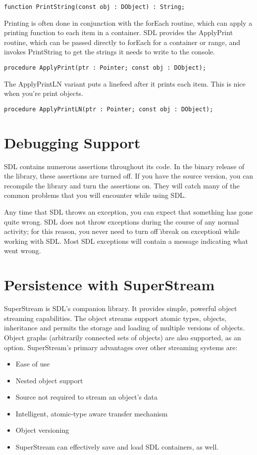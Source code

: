 \documentclass{report}
\begin{document}
\lstinline|function PrintString(const obj : DObject) : String;|

Printing is often done in conjunction with the forEach routine, which can
apply a printing function to each item in a container. SDL provides the
ApplyPrint routine, which can be passed directly to forEach for a container
or range, and invokes PrintString to get the strings
it needs to write to the console.

\lstinline|procedure ApplyPrint(ptr : Pointer; const obj : DObject);|

The ApplyPrintLN variant puts a linefeed after it prints 
each item. This is nice when you're print objects.

\lstinline|procedure ApplyPrintLN(ptr : Pointer; const obj : DObject);|

\chapter{Debugging Support}

SDL contains numerous assertions throughout its code.  In the binary release
of the library, these assertions are turned off. If you have the source
version, you can recompile the library and turn the assertions on. They will
catch many of the common problems that you will encounter while using SDL.

Any time that SDL throws an exception, you can expect that something has
gone quite wrong. SDL does not throw exceptions during the course of any
normal activity; for this reason, you never need to turn off \`{\i}break on
exception\^{\i} while working with SDL. Most SDL exceptions will contain a
message indicating what went wrong.

\chapter{Persistence with SuperStream}

SuperStream is SDL's companion library. It provides simple, powerful object
streaming capabilities. The object streams support atomic types, objects,
inheritance and permits the storage and loading of multiple versions of
objects. Object graphs (arbitrarily connected sets of objects) are also
supported, as an option. SuperStream's primary advantages over other
streaming systems are:

\begin{itemize}
\item Ease of use
\item Nested object support
\item Source not required to stream an object's data
\item Intelligent, atomic-type aware transfer mechanism
\item Object versioning
\item SuperStream can effectively save and load SDL containers, as well.
\end{itemize}
\end{document}

